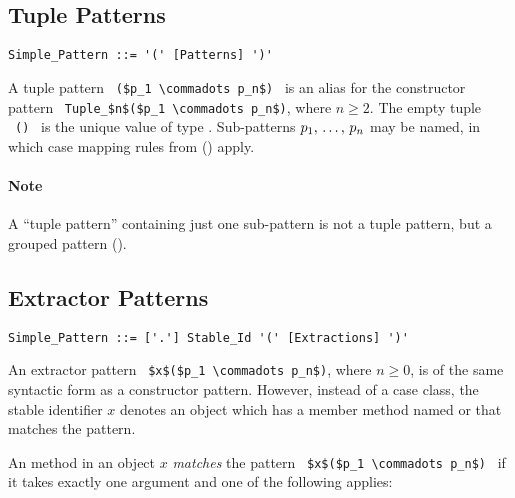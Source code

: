 \subsection{Tuple Patterns}
\label{sec:tuple-patterns}

\syntax\begin{lstlisting}
Simple_Pattern ::= '(' [Patterns] ')'
\end{lstlisting}

A tuple pattern ~\lstinline!($p_1 \commadots p_n$)!~ is an alias for the constructor pattern ~\lstinline!Tuple_$n$($p_1 \commadots p_n$)!, where $n \geq 2$. The empty tuple ~\lstinline!()!~ is the unique value of type . Sub-patterns $p_1 ,\, \ldots ,\, p_n$ may be named, in which case mapping rules from () apply. 

\paragraph{Note}
A ``tuple pattern'' containing just one sub-pattern is not a tuple pattern, but a grouped pattern ().





\subsection{Extractor Patterns}
\label{sec:extractor-patterns}

\syntax\begin{lstlisting}
Simple_Pattern ::= ['.'] Stable_Id '(' [Extractions] ')'
\end{lstlisting}

An extractor pattern ~\lstinline!$x$($p_1 \commadots p_n$)!, where $n \geq 0$, is of the same syntactic form as a constructor pattern. However, instead of a case class, the stable identifier $x$ denotes an object which has a member method named  or  that matches the pattern. 

An  method in an object $x$ {\em matches} the pattern ~\lstinline!$x$($p_1 \commadots p_n$)!~ if it takes exactly one argument and one of the following applies: 


